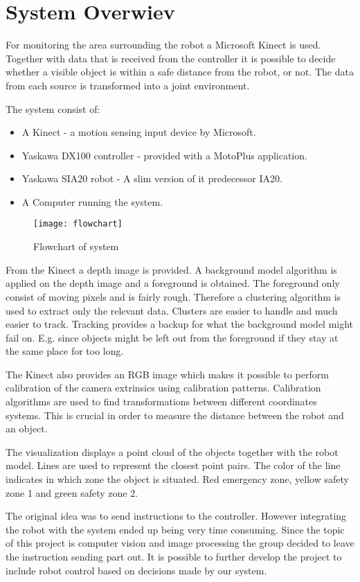 
\section{System Overwiev}

For monitoring the area surrounding the robot a Microsoft Kinect is used. Together with data that is received from the controller it is possible to decide whether a visible object is within a safe distance from the robot, or not. The data from each source is transformed into a joint environment.

The system consist of:
\begin{itemize}
\item A Kinect - a motion sensing input device by Microsoft.
\item Yaskawa DX100 controller - provided with a MotoPlus application.
\item Yaskawa SIA20 robot - A slim version of it predecessor IA20.
\item A Computer running the system.
\end{itemize}

\begin{figure}[H]
\begin{center}
\texttt{[image: flowchart]}
\caption{Flowchart of system}
\label{flowchart}
\end{center}
\end{figure}




From the Kinect a depth image is provided. A background model algorithm is applied on the depth image and a foreground is obtained. The foreground only consist of moving pixels and is fairly rough. Therefore a clustering algorithm is used to extract only the relevant data. Clusters are easier to handle and much easier to track. Tracking provides a backup for what the background model might fail on. E.g. since objects might be left out from the foreground if they stay at the same place for too long.

The Kinect also provides an RGB image which makes it possible to perform calibration of the camera extrinsics using calibration patterns. Calibration algorithms are used to find transformations between different coordinates systems. This is crucial in order to measure the distance between the robot and an object.

The visualization displays a point cloud of the objects together with the robot model. Lines are used to represent the closest point pairs. The color of the line indicates in which zone the object is situated. Red emergency zone, yellow safety zone 1 and green safety zone 2.

The original idea was to send instructions to the controller. However integrating the robot with the system ended up being very time consuming. Since the topic of this project is computer vision and image processing the group decided to leave the instruction sending part out. It is possible to further develop the project to include robot control based on decisions made by our system.   


